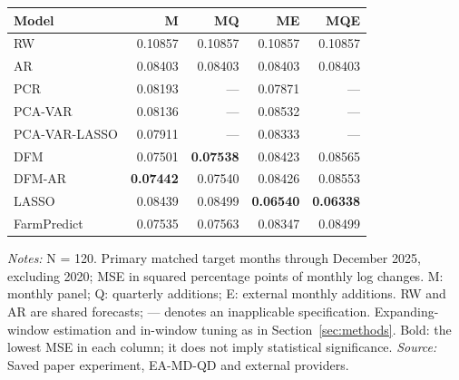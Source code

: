 \begin{threeparttable}
\begin{tabular}{lrrrr}
\toprule
Model & M & MQ & ME & MQE \\
\midrule
RW & 0.10857 & 0.10857 & 0.10857 & 0.10857 \\
AR & 0.08403 & 0.08403 & 0.08403 & 0.08403 \\
PCR & 0.08193 & --- & 0.07871 & --- \\
PCA-VAR & 0.08136 & --- & 0.08532 & --- \\
PCA-VAR-LASSO & 0.07911 & --- & 0.08333 & --- \\
DFM & 0.07501 & \textbf{0.07538} & 0.08423 & 0.08565 \\
DFM-AR & \textbf{0.07442} & 0.07540 & 0.08426 & 0.08553 \\
LASSO & 0.08439 & 0.08499 & \textbf{0.06540} & \textbf{0.06338} \\
FarmPredict & 0.07535 & 0.07563 & 0.08347 & 0.08499 \\
\bottomrule
\end{tabular}
\begin{tablenotes}[flushleft]\footnotesize
\item \textit{Notes:} N = 120. Primary matched target months through December 2025, excluding 2020; MSE in squared percentage points of monthly log changes. M: monthly panel; Q: quarterly additions; E: external monthly additions. RW and AR are shared forecasts; --- denotes an inapplicable specification. Expanding-window estimation and in-window tuning as in Section~\ref{sec:methods}. Bold: the lowest MSE in each column; it does not imply statistical significance. \textit{Source:} Saved paper experiment, EA-MD-QD and external providers.
\end{tablenotes}
\end{threeparttable}
